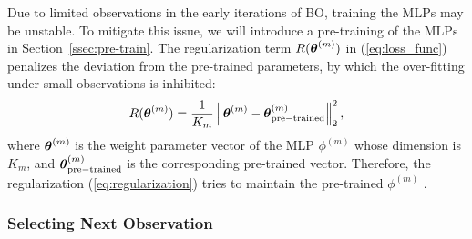 Due to limited observations in the early iterations of BO, training the MLPs may be unstable.
%
To mitigate this issue, we will introduce a pre-training of the MLPs in Section~\ref{ssec:pre-train}.
%
%
The regularization term $R(\boldsymbol{\theta}^{(m)})$ in (\ref{eq:loss_func}) penalizes the deviation from the pre-trained parameters, by which the over-fitting under small observations is inhibited: 
\begin{align}
 R(\boldsymbol{\theta}^{(m)}) = \frac{1}{K_m} \left\|\boldsymbol{\theta}^{(m)} - \boldsymbol{\theta}_{\rm pre-trained}^{(m)} \right\|_2^2,
 \label{eq:regularization}
\end{align}
where 
$\boldsymbol{\theta}^{(m)}$ is the weight parameter vector of the MLP $\phi^{(m)}$ whose dimension is $K_m$, and 
$\boldsymbol{\theta}_{\rm pre-trained}^{(m)}$
is the corresponding pre-trained vector.
%
Therefore, the regularization
(\ref{eq:regularization})
tries to maintain the pre-trained $\phi^{(m)}$
\cite{kirkpatrick2017overcoming}.

\subsubsection{Selecting Next Observation}
\label{sssec:acq}

